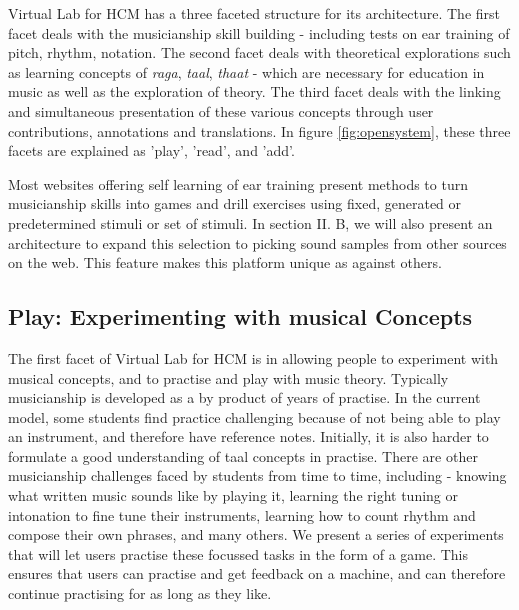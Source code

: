 \documentclass{tufte-handout}
\begin{document}
Virtual Lab for HCM has a three faceted structure for its architecture. The first facet deals with the musicianship skill building - including tests on ear training of pitch, rhythm, notation. The second facet deals with theoretical explorations such as learning concepts of \textit{raga}, \textit{taal}, \textit{thaat} - which are necessary for education in music as well as the exploration of theory. The third facet deals with the linking and simultaneous presentation of these various concepts through user contributions, annotations and translations. In figure \ref{fig:opensystem}, these three facets are explained as 'play', 'read', and 'add'.

Most websites offering self learning of ear training present methods to turn musicianship skills into games and drill exercises using fixed, generated or predetermined stimuli or set of stimuli. In section II. B, we will also present an architecture to expand this selection to picking sound samples from other sources on the web. This feature makes this platform unique as against others.


\subsection{Play: Experimenting with musical Concepts}

The first facet of Virtual Lab for HCM is in allowing people to experiment with musical concepts, and to practise and play with music theory. Typically musicianship is developed as a by product of years of practise. In the current model, some students find practice challenging because of not being able to play an instrument, and therefore have reference notes. Initially, it is also harder to formulate a good understanding of taal concepts in practise. There are other musicianship challenges faced by students from time to time, including - knowing what written music sounds like by playing it, learning the right tuning or intonation to fine tune their instruments, learning how to count rhythm and compose their own phrases, and many others. We present a series of experiments that will let users practise these focussed tasks in the form of a game. This ensures that users can practise and get feedback on a machine, and can therefore continue practising for as long as they like.
\end{document}
